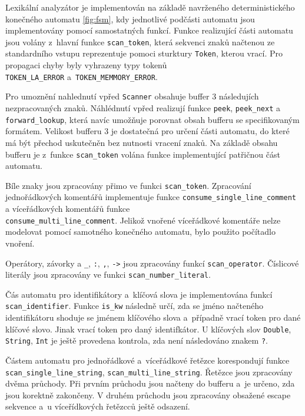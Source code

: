 \documentclass[11spt]{article}
\begin{document}
Lexikální analyzátor je implementován na základě navrženého deterministického konečného automatu \href{fig:fsm}{\ref{fig:fsm}}, kdy jednotlivé podčásti automatu
jsou implementovány pomocí samostatných funkcí. Funkce realizující části automatu jsou volány z~hlavní funkce \texttt{scan\_token},
která sekvenci znaků načtenou ze standardního vstupu reprezentuje pomoci sturktury \texttt{Token}, kterou vrací. Pro propagaci chyby byly vyhrazeny
typy tokenů\\ \texttt{TOKEN\_LA\_ERROR} a~\texttt{TOKEN\_MEMMORY\_ERROR}.

Pro umoznění nahlednutí vpřed \texttt{Scanner} obsahuje buffer 3 následujích nezpracovaných znaků.
Náhlédnutí vpřed realizují funkce \texttt{peek}, \texttt{peek\_next} a \texttt{forward\_lookup}, která navíc umožňuje
porovnat obsah bufferu se specifikovaným formátem. Velikost bufferu 3 je dostatečná pro určení části automatu,
do které má být přechod uskutečněn bez nutnosti vracení znaků. Na základě obsahu bufferu je z~funkce \texttt{scan\_token} volána 
funkce implementující patřičnou část automatu.


Bíle znaky jsou zpracovány přimo ve funkci \texttt{scan\_token}. Zpracování jednořádkových komentářů implementuje funkce
\texttt{consume\_single\_line\_comment} a víceřádkových komentářů funkce \\ \texttt{consume\_multi\_line\_comment}. Jelikož vnořené
víceřádkové komentáře nelze modelovat pomocí samotného konečného automatu, bylo použito počítadlo vnoření.

Operátory, závorky a \texttt{\_}, \texttt{:}, \texttt{,}, \texttt{->} jsou zpracovány funkcí \texttt{scan\_operator}.
Číslicové literály jsou zpracovány ve funkci \texttt{scan\_number\_literal}.

Čás automatu pro identifikátory a~klíčová slova je implementována funkcí \texttt{scan\_identifier}.
Funkce \texttt{is\_kw} následně určí, zda se jméno načteného identifikátoru shoduje se jménem klíčového slova a~případně
vrací token pro dané klíčové slovo. Jinak vrací token pro daný identifkátor. U klíčových slov \texttt{Double}, \texttt{String}, \texttt{Int}
je ještě provedena kontrola, zda není následováno znakem \texttt{?}.

Částem automatu pro jednořádkové a~víceřádkové řetězce korespondují funkce \\ \texttt{scan\_single\_line\_string}, \texttt{scan\_multi\_line\_string}.
Řetězce jsou zpracovány dvěma průchody. Při prvním průchodu jsou načteny do bufferu a~je určeno, zda jsou korektně zakončeny. V druhém průchodu
jsou zpracovány obsažené escape sekvence a~u víceřídkových řetězcců ještě odsazení.
\end{document}
